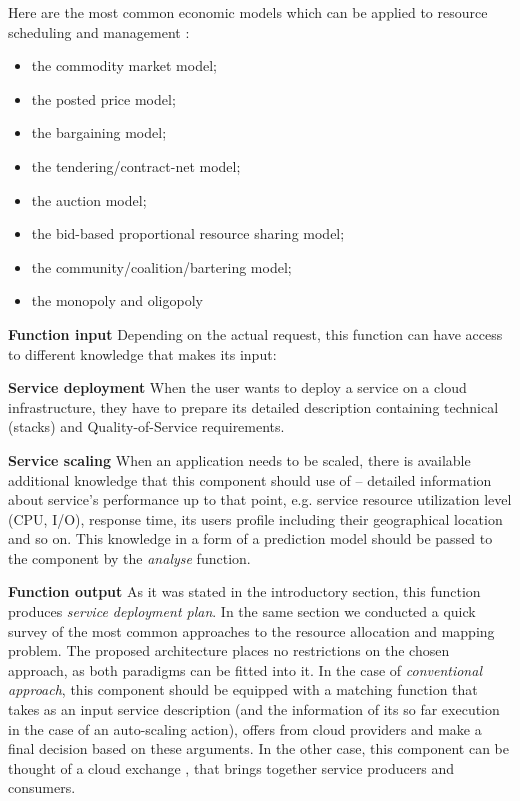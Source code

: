 \begin{asparaenum}
\begin{itemize}
      Here are the most common economic models which can be applied to resource scheduling and management \cite{buyya2002economic}:
      \begin{itemize}
        \item the commodity market model;
        \item the posted price model;
        \item the bargaining model;
        \item the tendering/contract-net model;
        \item the auction model;
        \item the bid-based proportional resource sharing model;
        \item the community/coalition/bartering model;
        \item the monopoly and oligopoly
      \end{itemize}
  \end{itemize}

\item[\textbf{Function input}] Depending on the actual request, this function can have access to different knowledge that makes its input:

  \begin{asparaenum}
  \item[\textbf{Service deployment}] When the user wants to deploy a service on a cloud infrastructure, they have to prepare its detailed description containing technical (stacks) and Quality-of-Service requirements.
  \item[\textbf{Service scaling}] When an application needs to be scaled, there is available additional knowledge that this component should use of -- detailed information about service's performance up to that point, e.g. service resource utilization level (CPU, I/O), response time, its users profile including their geographical location and so on. This knowledge in a form of a prediction model should be passed to the component by the \emph{analyse} function.
  \end{asparaenum}

\item[\textbf{Function output}] As it was stated in the introductory section, this function produces \emph{service deployment plan}. In the same section we conducted a quick survey of the most common approaches to the resource allocation and mapping problem. The proposed architecture places no restrictions on the chosen approach, as both paradigms can be fitted into it. In the case of \emph{conventional approach}, this component should be equipped with a matching function that takes as an input service description (and the information of its so far execution in the case of an auto-scaling action), offers from cloud providers and make a final decision based on these arguments.
  In the other case, this component can be thought of a cloud exchange \cite{InterCloud10}, that brings together service producers and consumers.
\end{asparaenum}

